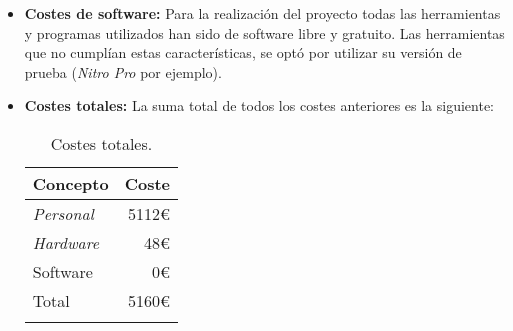 \begin{itemize}
\item\textbf{Costes de software:}
Para la realización del proyecto todas las herramientas y programas utilizados han sido de software libre y gratuito. Las herramientas que no cumplían estas características, se optó por utilizar su versión de prueba (\emph{Nitro Pro} por ejemplo).




\item\textbf{Costes totales:}
La suma total de todos los costes anteriores es la siguiente:


\begin{longtable}[]{@{}lr@{}}
\toprule
\begin{minipage}[b]{0.22\columnwidth}\raggedright\strut
\textbf{Concepto}\strut
\end{minipage} & \begin{minipage}[b]{0.22\columnwidth}\raggedright\strut
\textbf{Coste}\strut
\end{minipage}\tabularnewline
\midrule
\endhead
\begin{minipage}[t]{0.22\columnwidth}\raggedright\strut
\emph{Personal}\strut
\end{minipage} & \begin{minipage}[t]{0.22\columnwidth}\raggedright\strut
5112\euro{}\strut
\end{minipage}\tabularnewline
\begin{minipage}[t]{0.22\columnwidth}\raggedright\strut
\emph{Hardware}\strut
\end{minipage} & \begin{minipage}[t]{0.22\columnwidth}\raggedright\strut
48\euro{}\strut
\end{minipage}\tabularnewline
\begin{minipage}[t]{0.22\columnwidth}\raggedright\strut
Software\strut
\end{minipage} & \begin{minipage}[t]{0.22\columnwidth}\raggedright\strut
0\euro{}\strut
\end{minipage}\tabularnewline
\midrule
\begin{minipage}[t]{0.22\columnwidth}\raggedright\strut
Total\strut
\end{minipage} & \begin{minipage}[t]{0.22\columnwidth}\raggedright\strut
5160\euro{}\strut
\end{minipage}\tabularnewline
\bottomrule
\caption{Costes totales.}
\end{longtable}



\end{itemize}

